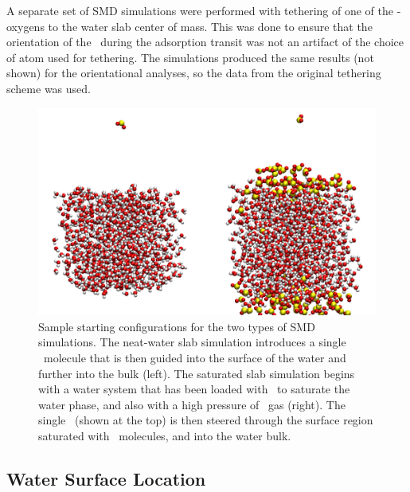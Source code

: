 \documentclass{article}
\begin{document}
A separate set of SMD simulations were performed with tethering of one of the \suldiox-oxygens to the water slab center of mass. This was done to ensure that the orientation of the \suldiox~during the adsorption transit was not an artifact of the choice of atom used for tethering. The simulations produced the same results (not shown) for the orientational analyses, so the data from the original tethering scheme was used.

\begin{figure}[h!]
	\begin{center}
		\includegraphics[scale=1.0]{images/startingconfigurations.png}
		\caption{Sample starting configurations for the two types of SMD simulations. The neat-water slab simulation introduces a single \suldiox~molecule that is then guided into the surface of the water and further into the bulk (left). The saturated slab simulation begins with a water system that has been loaded with \suldiox~to saturate the water phase, and also with a high pressure of \suldiox~gas (right). The single \suldiox~(shown at the top) is then steered through the surface region saturated with \suldiox~molecules, and into the water bulk.}
		\label{fig:starting-configurations}
	\end{center}
\end{figure}

\subsection {Water Surface Location}
\end{document}
